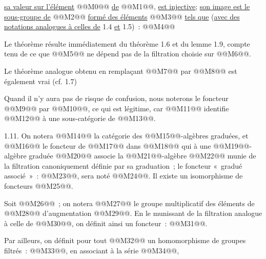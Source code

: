 
\uline{sa valeur sur l'élément} @@M0@@ \uline{de} @@M1@@, \uline{est injective}; \uline{son image est le sous-groupe de} @@M2@@ \uline{formé des éléments} @@M3@@ \uline{tels que} (\uline{avec des notations analogues à celles de} 1.4 \uline{et} 1.5)~:
@@M4@@

Le théorème résulte immédiatement du théorème 1.6 et du lemme 1.9, compte tenu de ce que @@M5@@ ne dépend pas de la filtration choisie sur @@M6@@.

Le théorème analogue obtenu en remplaçant @@M7@@ par @@M8@@ est également vrai (cf. 1.7)

Quand il n'y aura pas de risque de confusion, nous noterons le foncteur @@M9@@ par @@M10@@, ce qui est légitime, car @@M11@@ identifie @@M12@@ à une sous-catégorie de @@M13@@.

1.11. On notera @@M14@@ la catégorie des @@M15@@-algèbres graduées, et @@M16@@ le foncteur de @@M17@@ dans @@M18@@ qui à une @@M19@@-algèbre graduée @@M20@@ associe la @@M21@@-algèbre @@M22@@ munie de la filtration canoniquement définie par sa graduation~; le foncteur «~gradué associé~»~: @@M23@@, sera noté @@M24@@. Il existe un isomorphisme de foncteurs @@M25@@.

Soit @@M26@@~; on notera @@M27@@ le groupe multiplicatif des éléments de @@M28@@ d'augmentation @@M29@@. En le munissant de la filtration analogue à celle de @@M30@@, on définit ainsi un foncteur~: @@M31@@.

Par ailleurs, on définit pour tout @@M32@@ un homomorphisme de groupes filtrés~: @@M33@@, en associant à la série @@M34@@, 
